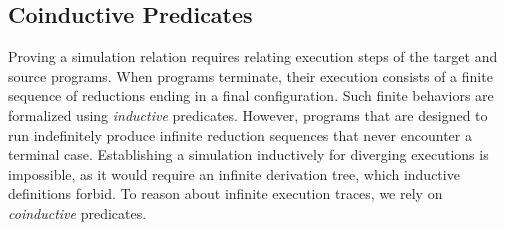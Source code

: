 \documentclass[report.tex]{subfiles}
\begin{document}
\subsection{Coinductive Predicates}

Proving a simulation relation requires relating execution steps
of the target and source programs.
When programs terminate,
their execution consists of a finite sequence of reductions ending in a
final configuration.
Such finite behaviors are formalized using \emph{inductive} predicates.
However,
programs that are designed to run indefinitely produce
infinite reduction sequences
that never encounter a terminal case.
Establishing a simulation inductively for diverging executions is impossible,
as it would require an infinite derivation tree,
which inductive definitions forbid.
To reason about infinite execution traces,
we rely on \emph{coinductive} predicates.
\end{document}
